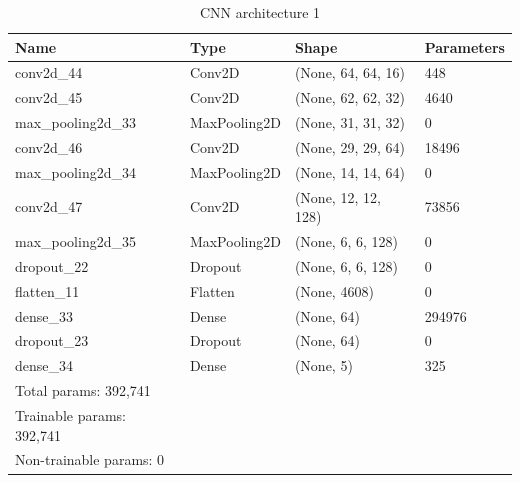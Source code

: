 \begin{table}[!ht]
\centering
    \caption{CNN architecture 1}
    \begin{tabular}{|l|l|l|l|}
    \hline
        Name & Type & Shape & Parameters \\ \hline
        conv2d\_44 & Conv2D & (None, 64, 64, 16) & 448 \\ \hline
        conv2d\_45 & Conv2D & (None, 62, 62, 32) & 4640 \\ \hline
        max\_pooling2d\_33 & MaxPooling2D & (None, 31, 31, 32) & 0 \\ \hline
        conv2d\_46 & Conv2D & (None, 29, 29, 64) & 18496 \\ \hline
        max\_pooling2d\_34 & MaxPooling2D & (None, 14, 14, 64) & 0 \\ \hline
        conv2d\_47 & Conv2D & (None, 12, 12, 128) & 73856 \\ \hline
        max\_pooling2d\_35 & MaxPooling2D & (None, 6, 6, 128) & 0 \\ \hline
        dropout\_22 & Dropout & (None, 6, 6, 128) & 0 \\ \hline
        flatten\_11 & Flatten & (None, 4608) & 0 \\ \hline
        dense\_33 & Dense & (None, 64) & 294976 \\ \hline
        dropout\_23 & Dropout & (None, 64) & 0 \\ \hline
        dense\_34 & Dense & (None, 5) & 325 \\ \hline
        Total params: 392,741 & ~ & ~ & ~ \\ \hline
        Trainable params: 392,741 & ~ & ~ & ~ \\ \hline
        Non-trainable params: 0 & ~ & ~ & ~\\ \hline
    \end{tabular}
\end{table}

